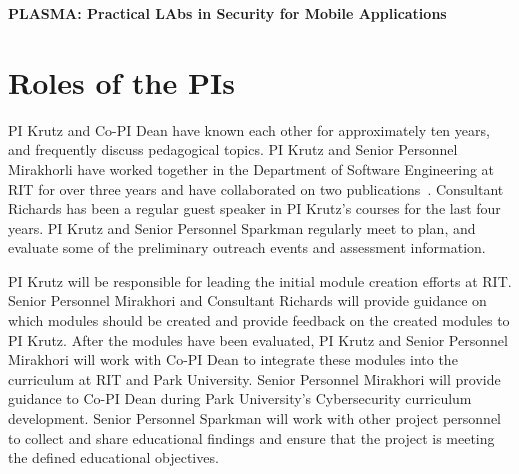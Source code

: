 \documentclass[11pt]{article}
\begin{document}
\setcounter{page}{1}

\def\myskip{3ex}

\centerline{\Large\bf PLASMA: Practical LAbs in Security for Mobile Applications}



\section{Roles of the PIs}

PI Krutz and Co-PI Dean have known each other for approximately ten years, and frequently discuss pedagogical topics. PI Krutz and Senior Personnel Mirakhorli have worked together in the Department of Software Engineering at RIT for over three years and have collaborated on two publications~\cite{SAC2016, MSRDan}. Consultant Richards has been a regular guest speaker in PI Krutz's courses for the last four years. PI Krutz and Senior Personnel Sparkman regularly meet to plan, and evaluate some of the preliminary outreach events and assessment information.



PI Krutz will be responsible for leading the initial module creation efforts at RIT. Senior Personnel Mirakhori and Consultant Richards will provide guidance on which modules should be created and provide feedback on the created modules to PI Krutz. After the modules have been evaluated, PI Krutz and Senior Personnel Mirakhori will work with Co-PI Dean to integrate these modules into the curriculum at RIT and Park University. Senior Personnel Mirakhori will provide guidance to Co-PI Dean during Park University's Cybersecurity curriculum development. Senior Personnel Sparkman will work with other project personnel to collect and share educational findings and ensure that the project is meeting the defined educational objectives.

\end{document}
